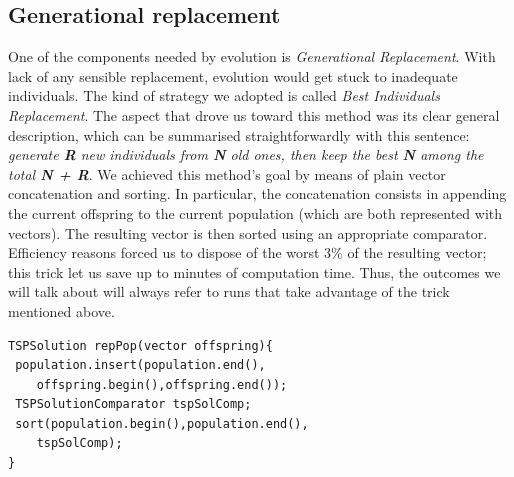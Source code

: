 \documentclass[letterpaper, 10 pt, conference]{ieeeconf}  %
\begin{document}
\subsection{Generational replacement}
One of the components needed by evolution is \textit{Generational Replacement}. With lack of any sensible replacement, evolution would get stuck to inadequate individuals. \newline 
The kind of strategy we adopted is called \textit{Best Individuals Replacement}. The aspect that drove us toward this method was its clear general description, which can be summarised straightforwardly with this sentence: \newline
\textit{generate \textbf{R} new individuals from \textbf{N} old ones, then keep the best \textbf{N} among the total \textbf{N + R}}. \newline
We achieved this method's goal by means of plain vector concatenation and sorting. In particular, the concatenation consists in appending the current offspring to the current population (which are both represented with vectors). The resulting vector is then sorted using an appropriate comparator. Efficiency reasons forced us to dispose of the worst 3\% of the resulting vector; this trick let us save up to minutes of computation time. Thus, the outcomes we will talk about will always refer to runs that take advantage of the trick mentioned above.
\begin{lstlisting}[caption={Best individual replacement, in \texttt{TSPPopulation.cpp}}]
TSPSolution repPop(vector offspring){ 
 population.insert(population.end(), 
    offspring.begin(),offspring.end());
 TSPSolutionComparator tspSolComp;
 sort(population.begin(),population.end(),
    tspSolComp);
}		
\end{lstlisting}
\end{document}
